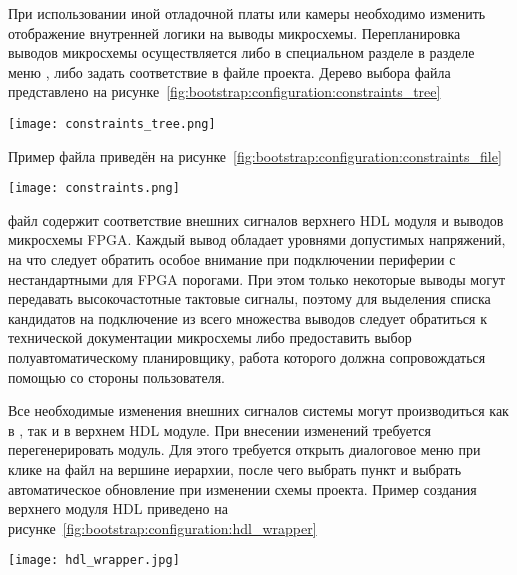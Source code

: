 При использовании иной отладочной платы или камеры необходимо изменить отображение внутренней
логики на выводы микросхемы. Перепланировка выводов микросхемы осуществляется либо в специальном
разделе  в разделе меню , либо задать соответствие в 
файле проекта. Дерево выбора  файла представлено на рисунке~\ref{fig:bootstrap:configuration:constraints_tree}

\begin{center}
  \centering
  \texttt{[image: constraints\_tree.png]}
  \label{fig:bootstrap:configuration:constraints_tree}
\end{center}

Пример  файла приведён на рисунке~\ref{fig:bootstrap:configuration:constraints_file}

\begin{center}
  \centering
  \texttt{[image: constraints.png]}
  \label{fig:bootstrap:configuration:constraints_file}
\end{center}

 файл содержит соответствие внешних сигналов верхнего HDL модуля и
выводов микросхемы FPGA. Каждый вывод обладает уровнями допустимых напряжений, на что
следует обратить особое внимание при подключении периферии с нестандартными для FPGA
порогами. При этом только некоторые выводы могут передавать высокочастотные
тактовые сигналы, поэтому для выделения списка кандидатов на подключение из всего
множества выводов следует обратиться к технической документации микросхемы либо
предоставить выбор полуавтоматическому планировщику, работа которого должна сопровождаться
помощью со стороны пользователя.

Все необходимые изменения внешних сигналов системы могут производиться как в ,
так и в верхнем HDL модуле. При внесении изменений требуется перегенерировать модуль. Для
этого требуется открыть диалоговое меню при клике на файл на вершине иерархии, после чего выбрать пункт
 и выбрать автоматическое обновление при изменении схемы проекта. Пример создания
верхнего модуля HDL приведено на рисунке~\ref{fig:bootstrap:configuration:hdl_wrapper}

\begin{center}
  \centering
  \texttt{[image: hdl\_wrapper.jpg]}
  \label{fig:bootstrap:configuration:hdl_wrapper}
\end{center}

